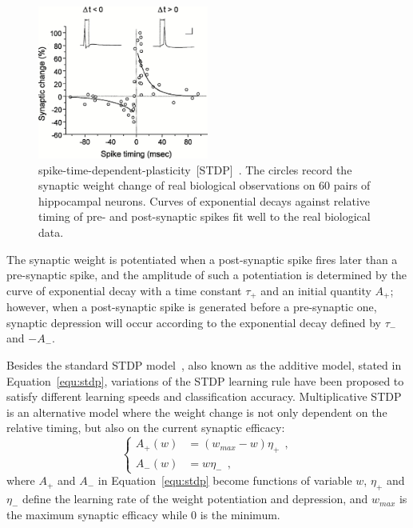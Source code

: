 \begin{figure}[bt!]
	\centering
	\includegraphics[width=0.5\textwidth]{pics_snn/stdp.jpeg}
	\caption{spike-time-dependent-plasticity~[STDP]~\citep{bi2001synaptic}.
	The circles record the synaptic weight change of real biological observations on 60 pairs of hippocampal neurons.
	Curves of exponential decays against relative timing of pre- and post-synaptic spikes fit well to the real biological data.
	}
	\label{Fig:STDP}
\end{figure}

The synaptic weight is potentiated when a post-synaptic spike fires later than a pre-synaptic spike, and the amplitude of such a potentiation is determined by the curve of exponential decay with a time constant $\tau_+$ and an initial quantity $A_+$;
however, when a post-synaptic spike is generated before a pre-synaptic one, synaptic depression will occur according to the exponential decay defined by $\tau_-$ and ${-A}_-$.

Besides the standard STDP model~\citep{song2000competitive}, also known as the additive model, stated in Equation~\ref{equ:stdp}, variations of the STDP learning rule have been proposed to satisfy different learning speeds and classification accuracy.
Multiplicative STDP~\citep{morrison2008phenomenological} is an alternative model where the weight change is not only dependent on the relative timing, but also on the current synaptic efficacy:
\begin{equation}
\left\{
\begin{aligned}
A_+ (w) &=  (w_{max} - w)\eta_+~~, \\
A_- (w) &= w\eta_-~~,
\end{aligned}
\right.
\end{equation}
where $A_+$ and $A_-$ in Equation~\ref{equ:stdp} become functions of variable 
$w$, $\eta_+$ and $\eta_-$ define the learning rate of the weight potentiation and depression, and $w_{max}$ is the maximum synaptic efficacy while 0 is the minimum.

